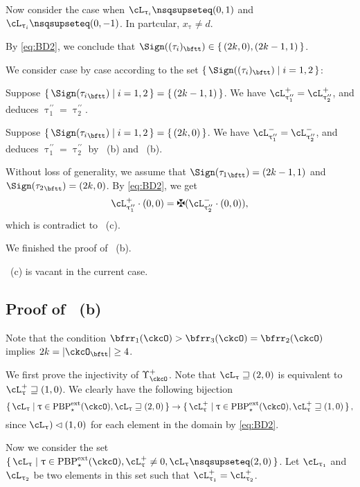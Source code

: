 \documentclass[12pt,a4paper]{amsart}
\def\abs#1{\left|{#1}\right|}
\def\pac#1{\ac_{#1}^+}
\def\nac#1{\ac_{#1}^-}
\numberwithin{equation}{section}
\theoremstyle{remark}
\def\PBPes{\mathrm{PBP}^{\mathrm{ext}}_{\star}}
\def\uptaupp{\uptau^{\prime\prime}}
\begin{document}
\smallskip

Now consider the case when $\ac_{\uptau_{i}}\nsqsupseteq (0,1)$
and $\ac_{\uptau_{i}}\nsqsupseteq (0,-1)$. In partcular, $x_{\uptau}\neq d$.

By \eqref{eq:BD2}, we conclude that $\Sign((\tau_{i})_{\bftt}) \in \set{ (2k,0),(2k-1,1)}$.

We consider case by case according to the set $\set{\Sign((\tau_{i})_{\bftt})|i=1,2}$:
  \begin{enumPF}
    \item Suppose
    $\set{\Sign({\tau_{i}}_{\bftt})|i=1,2} = \set{(2k-1,1)}$. We have
    $\pac{\uptaupp_{1}}=\pac{\uptaupp_{2}}$, and deduces
    $\uptaupp_{1}=\uptaupp_{2}$.
    \item
    Suppose $\set{\Sign({\tau_{i}}_{\bftt})|i=1,2} = \set{(2k,0)}$. We have
    $\nac{\uptaupp_{1}}=\nac{\uptaupp_{2}}$, and deduces
    $\uptaupp_{1}=\uptaupp_{2}$ by ~(b) and ~(b).
    \item
    Without loss of generality, we assume that
    $\Sign({\tau_{1}}_{\bftt}) = (2k-1,1)$ and
    $\Sign({\tau_{2}}_{\bftt}) = (2k,0)$.
    By \eqref{eq:BD2}, we get
    \[
      \pac{\uptaupp_{1}}\cdot (0,0)=\maltese(\nac{\uptaupp_{2}}\cdot (0,0)),
    \]
    which is contradict to ~(c).
  \end{enumPF}
  We finished the proof of ~(b).

  ~(c) is vacant in the current case.


\subsection*{\bf Proof of ~(b)}
Note that the condition $\bfrr_{1}(\ckcO)>\bfrr_{3}(\ckcO)=\bfrr_{2}(\ckcO)$
implies $2k = \abs{\ckcO_{\bftt}}\geq 4$.


We first prove the injectivity of $\Upsilon^{+}_{\ckcO}$.
  Note that $\ac_{\uptau}\sqsupseteq (2,0)$ is equivalent to
  $\pac{\uptau}\sqsupseteq (1,0)$.
  We clearly have the following  bijection
  \[
    \set{\ac_{\uptau}|\uptau\in \PBPes(\ckcO),\ac_{\uptau}\sqsupseteq (2,0)} \rightarrow \set{\pac{\uptau}|\uptau\in \PBPes(\ckcO),\pac{\uptau}\sqsupseteq (1,0)},
  \]
  since  $\ac_{\uptau})\lhd (1,0)$ for each element in the domain by \eqref{eq:BD2}.

  Now we consider the set
  $\set{\ac_{\uptau}|\uptau\in \PBPes(\ckcO), \pac{\uptau}\neq 0, \ac_{\uptau}\nsqsupseteq (2,0)}$. Let
  $\ac_{\uptau_{1}}$ and $\ac_{\uptau_{2}}$ be two elements in this set such that
  $\pac{\uptau_{1}}=\pac{\uptau_{2}}$.
\end{document}
